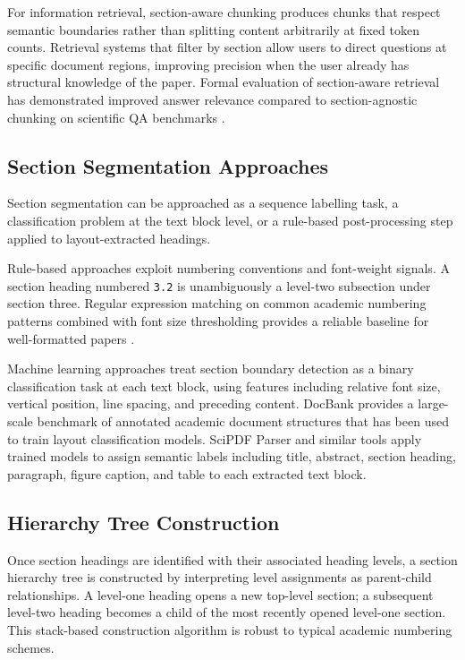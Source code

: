 \documentclass[12pt,a4paper]{report}
\begin{document}
For information retrieval, section-aware chunking produces 
chunks that respect semantic boundaries rather than splitting 
content arbitrarily at fixed token counts. Retrieval systems 
that filter by section allow users to direct questions at 
specific document regions, improving precision when the user 
already has structural knowledge of the paper. Formal 
evaluation of section-aware retrieval has demonstrated 
improved answer relevance compared to section-agnostic 
chunking on scientific QA benchmarks \cite{yang2023}.

\subsection{Section Segmentation Approaches}

Section segmentation can be approached as a sequence 
labelling task, a classification problem at the text block 
level, or a rule-based post-processing step applied to 
layout-extracted headings.

Rule-based approaches exploit numbering conventions and 
font-weight signals. A section heading numbered \texttt{3.2} 
is unambiguously a level-two subsection under section three. 
Regular expression matching on common academic numbering 
patterns combined with font size thresholding provides a 
reliable baseline for well-formatted papers \cite{mao2012}.

Machine learning approaches treat section boundary detection 
as a binary classification task at each text block, using 
features including relative font size, vertical position, 
line spacing, and preceding content. DocBank \cite{li2020} 
provides a large-scale benchmark of annotated academic 
document structures that has been used to train layout 
classification models. SciPDF Parser and similar tools 
apply trained models to assign semantic labels including 
title, abstract, section heading, paragraph, figure caption, 
and table to each extracted text block.

\subsection{Hierarchy Tree Construction}

Once section headings are identified with their associated 
heading levels, a section hierarchy tree is constructed by 
interpreting level assignments as parent-child relationships. 
A level-one heading opens a new top-level section; a 
subsequent level-two heading becomes a child of the most 
recently opened level-one section. This stack-based 
construction algorithm is robust to typical academic 
numbering schemes.
\end{document}
